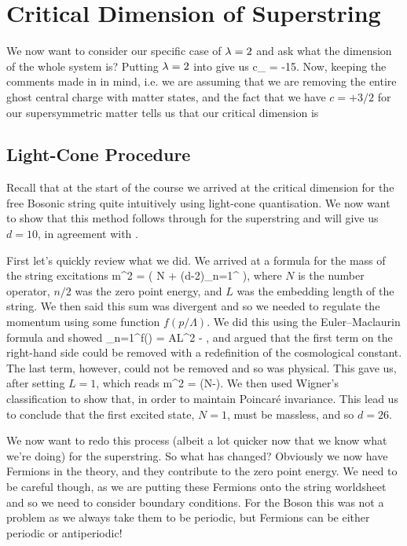 \section{Critical Dimension of Superstring}

We now want to consider our specific case of $\lambda=2$ and ask what the dimension of the whole system is? Putting $\lambda=2$ into  give us 
\be 
\label{eqn:GhostSuperCentralCharge}
    c_{} = -15.
\ee 
Now, keeping the comments made in  in mind, i.e. we are assuming that we are removing the entire ghost central charge with matter states, and the fact that we have $c=+3/2$ for our supersymmetric matter tells us that our critical dimension is 

\subsection{Light-Cone Procedure}

Recall that at the start of the course we arrived at the critical dimension for the free Bosonic string quite intuitively using light-cone quantisation. We now want to show that this method follows through for the superstring and will give us $d=10$, in agreement with .

First let's quickly review what we did. We arrived at a formula for the mass of the string excitations
\bse 
    m^2 = \bigg( N + (d-2)\sum_{n=1}^{\infty} \bigg),
\ese 
where $N$ is the number operator, $n/2$ was the zero point energy, and $L$ was the embedding length of the string. We then said this sum was divergent and so we needed to regulate the momentum using some function $f(p/\Lambda)$. We did this using the Euler–Maclaurin formula and showed 
\bse 
    \sum_{n=1}^{\infty}f\bigg(\bigg) = AL\Lambda^2 - ,
\ese 
and argued that the first term on the right-hand side could be removed with a redefinition of the cosmological constant. The last term, however, could not be removed and so was physical. This gave us, after setting $L=1$,  which reads
\bse 
    m^2 = \bigg(N-\bigg).
\ese 
We then used Wigner's classification to show that, in order to maintain Poincar\'{e} invariance. This lead us to conclude that the first excited state, $N=1$, must be massless, and so $d=26$. 

We now want to redo this process (albeit a lot quicker now that we know what we're doing) for the superstring. So what has changed? Obviously we now have Fermions in the theory, and they contribute to the zero point energy. We need to be careful though, as we are putting these Fermions onto the string worldsheet and so we need to consider boundary conditions. For the Boson this was not a problem as we always take them to be periodic, but Fermions can be either periodic or antiperiodic! 

